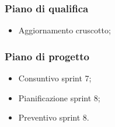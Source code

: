 \subsubsection{Piano di qualifica}
\begin{itemize}
    \item Aggiornamento cruscotto;
\end{itemize}

\subsubsection{Piano di progetto}
\begin{itemize}
    \item Consuntivo sprint 7;
    \item Pianificazione sprint 8;
    \item Preventivo sprint 8.
\end{itemize}